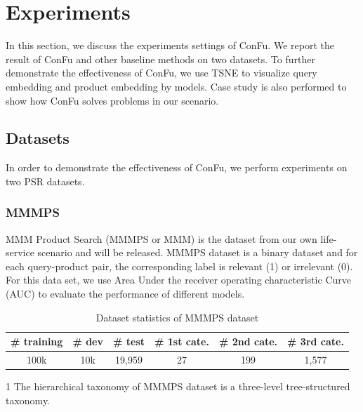 \section{Experiments}

In this section, we discuss the experiments settings of ConFu. We report the result of ConFu and other baseline methods on two datasets. To further demonstrate the effectiveness of ConFu, we use TSNE \cite{van2008visualizing} to visualize query embedding and product embedding by models. Case study is also performed to show how ConFu solves problems in our scenario.

\subsection{Datasets}

In order to demonstrate the effectiveness of ConFu, we perform experiments on two PSR datasets. 

\subsubsection{MMMPS}
MMM Product Search (MMMPS or MMM) is the dataset from our own life-service scenario and will be released. MMMPS dataset is a binary dataset and for each query-product pair, the corresponding label is relevant (1) or irrelevant (0). For this data set, we use Area Under the receiver operating characteristic Curve (AUC) to evaluate the performance of different models. 

\begin{table}[th]
\setlength{\tabcolsep}{2.8pt}
\begin{threeparttable}[b]
  \caption{Dataset statistics of MMMPS dataset}
  \label{tb:dataset}
  \centering
  \begin{tabular}{cccccc}
    \toprule
    \# training  & \# dev  & \# test  & \# 1st cate. & \# 2nd cate. & \# 3rd cate. \\
    \midrule
    100k & 10k & 19,959 & 27 & 199 & 1,577 \\
    \bottomrule
  \end{tabular}
  \begin{tablenotes}
    \item[1] The hierarchical taxonomy of MMMPS dataset is a three-level tree-structured taxonomy.
  \end{tablenotes}
  \end{threeparttable}
\end{table}

